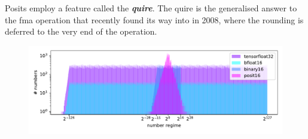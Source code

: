 \documentclass{article}
\theoremstyle{plain} %
\theoremstyle{convention} %
\theoremstyle{remark} %
\def\df#1{\textbf{\textit{#1}}}
\numberwithin{equation}{section}
\begin{document}
Posits employ a feature called the \df{quire}. The \gls{quire} is the generalised answer to the \gls{fma} operation that recently found its way into \cite{ieee754_2008} in 2008, where the rounding is deferred to the very end of the operation.

\begin{figure}
    \centering
    \includegraphics[width=1.0\textwidth]{plots/number_line2}

\end{figure}
\end{document}
